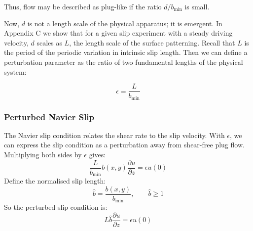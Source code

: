 \documentclass[12pt, a4paper, twoside, openright]{book}
\newcommand{\bmin}{\ensuremath{b_{\mathrm{min}}}}
\begin{document}

Thus, flow may be described as plug-like if the ratio $d/ \bmin$ is small.

Now, $d$ is not a length scale of the physical apparatus; it is emergent.  In Appendix C we show that for a given slip experiment with a steady driving velocity, $d$ scales as $L$, the length scale of the surface patterning.  Recall that $L$ is the period of the periodic variation in intrinsic slip length.  Then we can define a perturbation parameter as the ratio of two fundamental lengths of the physical system:

\begin{equation}
\epsilon = \frac{L}{\bmin}
\end{equation}



%

\subsubsection*{Perturbed Navier Slip}

The Navier slip condition relates the shear rate to the slip velocity.  With $\epsilon$, we can express the slip condition as a perturbation away from shear-free plug flow.  Multiplying both sides by $\epsilon$ gives:
\begin{equation}
\frac{L}{\bmin} b(x,y) \frac{\partial u }{\partial z} = \epsilon u(0)
\end{equation}
Define the normalised slip length:
\begin{equation}
\hat{b} = \frac{b(x,y)}{\bmin},   \qquad \hat{b} \geq 1
\end{equation}
So the perturbed slip condition is:
\begin{equation}
L \hat{b} \frac{\partial u}{\partial z} = \epsilon u(0)
\end{equation}
\end{document}
